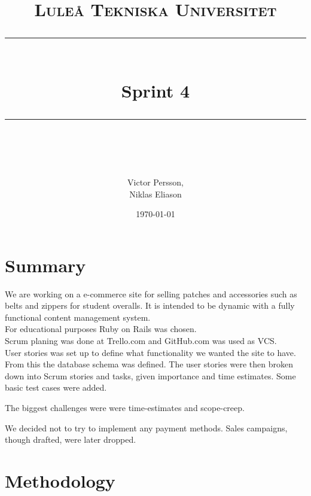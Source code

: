 \documentclass[paper=a4, fontsize=11pt]{report} %
\newcommand{\horrule}[1]{\rule{\linewidth}{#1}}       %
\begin{document}
%
\title{
	\normalfont \normalsize
	\textsc{Luleå Tekniska Universitet} \\ [25pt] %
	\horrule{1pt} \\[0.4cm]                       %
	\huge Sprint 4 \\                             %
	\horrule{1pt} \\[0.5cm]                       %
}
%
\author{Victor Persson,\\ Niklas Eliason}             %
%
\date{\normalsize\today}                              %
%
\maketitle                                            %
%
\tableofcontents
\thispagestyle{empty}
\sectionfont{\scshape}
%
\newpage
\setcounter{page}{1}


\section*{Summary}
	We are working on a e-commerce site for selling patches and accessories such as
	belts and zippers for student overalls. It is intended to be dynamic with a
	fully functional content management system. \\
	For educational purposes Ruby on Rails was chosen. \\
	Scrum planing was done at Trello.com and GitHub.com was used as VCS. \\

	User stories was set up to define what functionality we wanted the site
	to have. From this the database schema was defined. The user
	stories were then broken down into Scrum stories and tasks, given importance
	and time estimates. Some basic test cases were added.

	The biggest challenges were were time-estimates and scope-creep.

	We decided not to try to implement any payment methods. Sales campaigns,
	though drafted, were later dropped.

\section*{Methodology}
\end{document}
